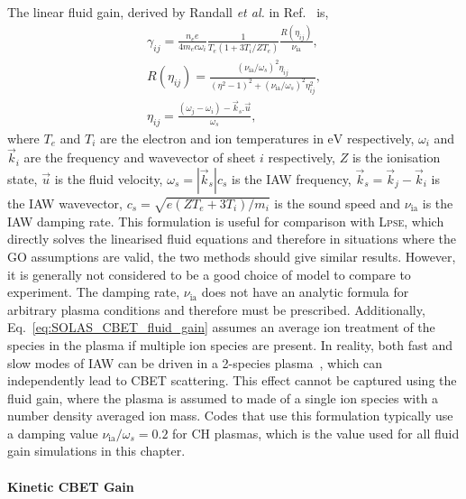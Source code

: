 The linear fluid gain, derived by Randall \textit{et al.} in Ref.~\cite{randall_theory_1981} is,
\begin{equation}
    \label{eq:SOLAS_CBET_fluid_gain}
    \begin{gathered}
        \gamma_{ij} = \frac{n_e e}{4 m_e c \omega_i} \frac{1}{T_e \left( 1 + 3 T_i / Z T_e \right)} \frac{R(\eta_{ij})}{\nu_{\text{ia}}}, \\
        R(\eta_{ij}) = \frac{ (\nu_{\text{ia}}/\omega_{s})^2 \eta_{ij} } { (\eta^2 - 1)^2 + (\nu_{\text{ia}}/\omega_s)^2 \eta_{ij}^2 }, \\
        \eta_{ij} = \frac{ (\omega_j-\omega_i) - \vec{k}_s.\vec{u} }{\omega_s},
    \end{gathered}
\end{equation}
where $T_e$ and $T_i$ are the electron and ion temperatures in $\text{eV}$ respectively, $\omega_i$ and $\vec{k}_i$ are the frequency and wavevector of sheet $i$ respectively, $Z$ is the ionisation state, $\vec{u}$ is the fluid velocity, $\omega_s = |\vec{k}_s|c_s$ is the \ac{IAW} frequency, $\vec{k}_s = \vec{k}_j - \vec{k}_i$ is the \ac{IAW} wavevector, $c_s = \sqrt{e(Z T_e + 3 T_i)/m_i}$ is the sound speed and $\nu_{\text{ia}}$ is the \ac{IAW} damping rate.
This formulation is useful for comparison with \textsc{Lpse}, which directly solves the linearised fluid equations and therefore in situations where the \ac{GO} assumptions are valid, the two methods should give similar results.
However, it is generally not considered to be a good choice of model to compare to experiment.
The damping rate, $\nu_{\text{ia}}$ does not have an analytic formula for arbitrary plasma conditions and therefore must be prescribed.
Additionally, Eq.~\ref{eq:SOLAS_CBET_fluid_gain} assumes an average ion treatment of the species in the plasma if multiple ion species are present.
In reality, both fast and slow modes of \ac{IAW} can be driven in a 2-species plasma~\cite{williams_frequency_1995}, which can independently lead to \ac{CBET} scattering.
This effect cannot be captured using the fluid gain, where the plasma is assumed to made of a single ion species with a number density averaged ion mass.
Codes that use this formulation typically use a damping value $\nu_{\text{ia}}/\omega_s=0.2$ for CH plasmas, which is the value used for all fluid gain simulations in this chapter.

\paragraph*{Kinetic CBET Gain}

